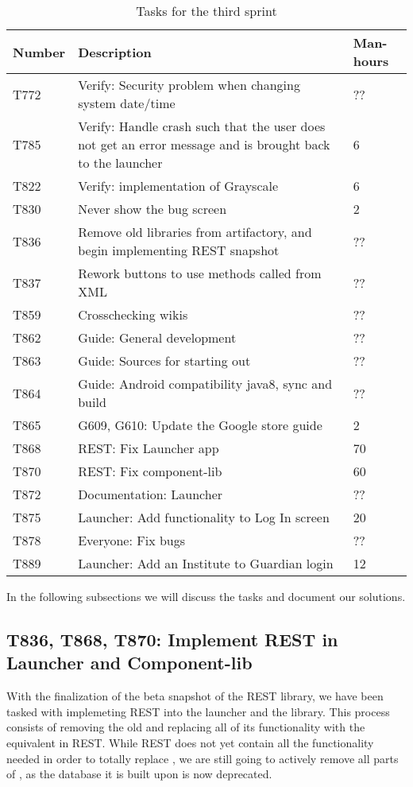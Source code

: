 \begin{table}[H]
\begin{centering}
\begin{tabular}{|l|p{9cm}|l|}
\hline
Number 	& Description & Man-hours \\ \hline
T772    & Verify: Security problem when changing system date/time & ??\\\hline
T785	& Verify: Handle crash such that the user does not get an error message and
is brought back to the launcher & 6\\ \hline
T822    & Verify: implementation of Grayscale & 6\\\hline
T830    & Never show the bug screen & 2 \\\hline
T836	& Remove old libraries from artifactory, and begin implementing REST
snapshot & ??\\\hline
T837	& Rework buttons to use methods called from XML & ??\\\hline
T859   	& Crosschecking wikis & ??\\\hline
T862  	& Guide: General development & ?? \\ \hline
T863	& Guide: Sources for starting out & ??\\ \hline
T864	& Guide: Android compatibility java8, sync and build & ??\\
\hline 
T865	& G609, G610: Update the Google store guide & 2\\\hline
T868    & REST: Fix Launcher app & 70 \\\hline
T870    & REST: Fix component-lib & 60\\\hline
T872 	& Documentation: Launcher & ??\\ \hline
T875 	& Launcher: Add functionality to Log In screen & 20\\\hline 
T878 	& Everyone: Fix bugs & ??\\ \hline
T889	& Launcher: Add an Institute to Guardian login & 12 \\\hline
\end{tabular}
\caption{Tasks for the third sprint}
\label{Tasks3}
\end{centering}
\end{table}

In the following subsections we will discuss the tasks and document our
solutions.

\subsection{T836, T868, T870: Implement REST in Launcher and Component-lib}
With the finalization of the beta snapshot of the REST library, we have been
tasked with implemeting REST into the launcher and the 
library. This process consists of removing the old  and replacing
all of its functionality with the equivalent in REST. While REST does not yet
contain all the functionality needed in order to totally replace ,
we are still going to actively remove all parts of , as the
database it is built upon is now deprecated.\nl

